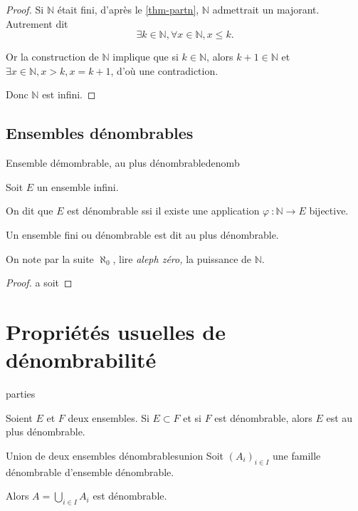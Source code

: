 \documentclass[a4paper,french,final]{memoir}
\begin{document}
\begin{proof}
	Si $\mathbb{N}$ était fini, d'après le \cref{thm-partn}, $\mathbb{N}$ admettrait un majorant. Autrement dit \[\exists k \in \mathbb{N}, \forall x \in \mathbb{N}, x \leq k.\]

	Or la construction de $\mathbb{N}$ implique que si $ k \in \mathbb{N}$, alors $k + 1 \in \mathbb{N}$ et $\exists x \in \mathbb{N}, x > k, x= k+1$, d'où une contradiction. 
	
	Donc $\mathbb{N}$ est infini.
\end{proof}

\section{Ensembles dénombrables}

\begin{defb}{Ensemble démombrable, au plus dénombrable}{denomb}

	 Soit $E$ un ensemble infini. 
	 
	 On dit que $E$ est dénombrable ssi il existe une application $\varphi~: \mathbb{N} \to E $ bijective. 
	 
	 Un ensemble fini ou dénombrable est dit au plus dénombrable. 
\end{defb}

On note par la suite $\aleph_0$, lire \emph{aleph zéro,} la puissance de $\mathbb{N}$. 

\begin{proof}
a
soit
\end{proof}

\chapter{Propriétés usuelles de dénombrabilité}

\begin{theoremb}{}{parties}

	Soient $E$ et $F$ deux ensembles. 
	Si $E \subset F$ et si $F$ est dénombrable, alors $E$ est au plus dénombrable.
\end{theoremb}

\begin{theoremb}{Union de deux ensembles dénombrables}{union}
    Soit $(A_i)_{i \in I}$ une famille dénombrable d'ensemble dénombrable. 
	
	Alors $A= \bigcup_{i \in I} A_i$ est dénombrable. 
\end{theoremb}
\end{document}
